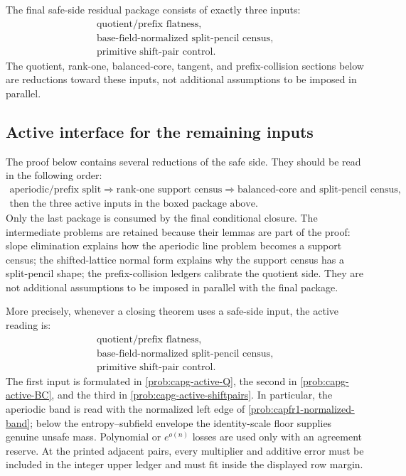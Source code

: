 \documentclass[11pt]{article}
\theoremstyle{definition}
\theoremstyle{remark}
\begin{document}
The final safe-side residual package consists of exactly three inputs:
\[
\boxed{\begin{gathered}
\text{quotient/prefix flatness},\\
\text{base-field-normalized split-pencil census},\\
\text{primitive shift-pair control}.
\end{gathered}}
\]
The quotient, rank-one, balanced-core, tangent, and prefix-collision sections below are reductions toward these inputs, not additional assumptions to be imposed in parallel.

\subsection{Active interface for the remaining inputs}
\label{subsec:capg-active-interface}

The proof below contains several reductions of the safe side.  They should be
read in the following order:
\[
\begin{gathered}
        \text{aperiodic/prefix split}
        \Longrightarrow
        \text{rank-one support census}
        \Longrightarrow
        \text{balanced-core and split-pencil census},\\
        \text{then the three active inputs in the boxed package above.}
\end{gathered}
\]
Only the last package is consumed by the final conditional closure.  The
intermediate problems are retained because their lemmas are part of the proof:
slope elimination explains how the aperiodic line problem becomes a support
census; the shifted-lattice normal form explains why the support census has a
split-pencil shape; the prefix-collision ledgers calibrate the quotient side.
They are not additional assumptions to be imposed in parallel with the final
package.

More precisely, whenever a closing theorem uses a safe-side input, the active
reading is:
\[
\boxed{
\begin{gathered}
\text{quotient/prefix flatness},\\
\text{base-field-normalized split-pencil census},\\
\text{primitive shift-pair control}.
\end{gathered}}
\]
The first input is formulated in \cref{prob:capg-active-Q}, the second in
\cref{prob:capg-active-BC}, and the third in
\cref{prob:capg-active-shiftpairs}.  In particular, the aperiodic band is read
with the normalized left edge of \cref{prob:capfr1-normalized-band}; below the
entropy--subfield envelope the identity-scale floor supplies genuine unsafe
mass.  Polynomial or \(e^{o(n)}\) losses are used only with an agreement
reserve.  At the printed adjacent pairs, every multiplier and additive error
must be included in the integer upper ledger and must fit inside the displayed
row margin.
\end{document}
